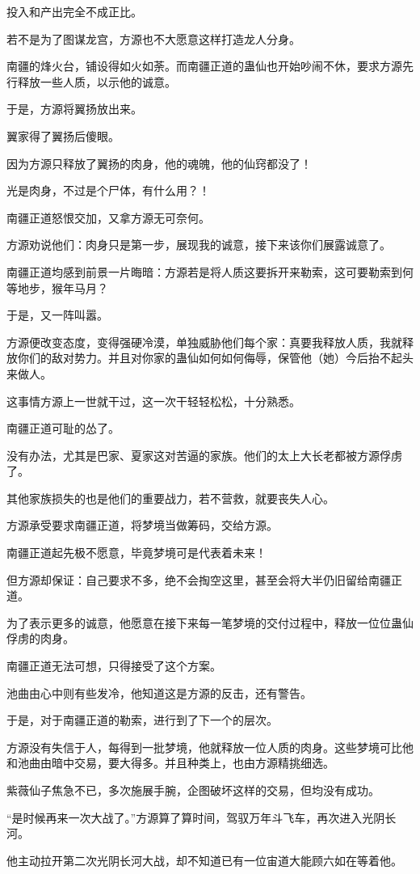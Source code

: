 \begin{this_body}
投入和产出完全不成正比。

若不是为了图谋龙宫，方源也不大愿意这样打造龙人分身。

南疆的烽火台，铺设得如火如荼。而南疆正道的蛊仙也开始吵闹不休，要求方源先行释放一些人质，以示他的诚意。

于是，方源将翼扬放出来。

翼家得了翼扬后傻眼。

因为方源只释放了翼扬的肉身，他的魂魄，他的仙窍都没了！

光是肉身，不过是个尸体，有什么用？！

南疆正道怒恨交加，又拿方源无可奈何。

方源劝说他们：肉身只是第一步，展现我的诚意，接下来该你们展露诚意了。

南疆正道均感到前景一片晦暗：方源若是将人质这要拆开来勒索，这可要勒索到何等地步，猴年马月？

于是，又一阵叫嚣。

方源便改变态度，变得强硬冷漠，单独威胁他们每个家：真要我释放人质，我就释放你们的敌对势力。并且对你家的蛊仙如何如何侮辱，保管他（她）今后抬不起头来做人。

这事情方源上一世就干过，这一次干轻轻松松，十分熟悉。

南疆正道可耻的怂了。

没有办法，尤其是巴家、夏家这对苦逼的家族。他们的太上大长老都被方源俘虏了。

其他家族损失的也是他们的重要战力，若不营救，就要丧失人心。

方源承受要求南疆正道，将梦境当做筹码，交给方源。

南疆正道起先极不愿意，毕竟梦境可是代表着未来！

但方源却保证：自己要求不多，绝不会掏空这里，甚至会将大半仍旧留给南疆正道。

为了表示更多的诚意，他愿意在接下来每一笔梦境的交付过程中，释放一位位蛊仙俘虏的肉身。

南疆正道无法可想，只得接受了这个方案。

池曲由心中则有些发冷，他知道这是方源的反击，还有警告。

于是，对于南疆正道的勒索，进行到了下一个的层次。

方源没有失信于人，每得到一批梦境，他就释放一位人质的肉身。这些梦境可比他和池曲由暗中交易，要大得多。并且种类上，也由方源精挑细选。

紫薇仙子焦急不已，多次施展手腕，企图破坏这样的交易，但均没有成功。

“是时候再来一次大战了。”方源算了算时间，驾驭万年斗飞车，再次进入光阴长河。

他主动拉开第二次光阴长河大战，却不知道已有一位宙道大能顾六如在等着他。

\end{this_body}

